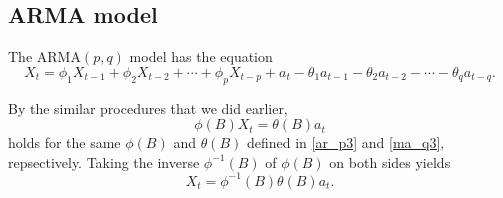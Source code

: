 \documentclass{article}
\newcommand\arma{\ensuremath{\text{ARMA}}}
\begin{document}
%
\subsection{ARMA model}
The \(\arma(p,q)\) model has the equation
\begin{equation}\label{arma_pq1}
X_t=\phi_1X_{t-1}+\phi_2X_{t-2}+\cdots+\phi_pX_{t-p}+a_t-\theta_1a_{t-1}-\theta_2a_{t-2}-\cdots-\theta_qa_{t-q}.
\end{equation}

By the similar procedures that we did earlier,
\begin{equation}\label{arma_pq2}
\phi(B)X_t=\theta(B)a_t
\end{equation}
holds for the same \(\phi(B)\) and \(\theta(B)\) defined in \eqref{ar_p3} and \eqref{ma_q3}, repsectively.
Taking the inverse \(\phi^{-1}(B)\) of \(\phi(B)\) on both sides yields
\begin{equation}\label{arma_pq2}
X_t=\phi^{-1}(B)\theta(B)a_t.
\end{equation}
\end{document}
